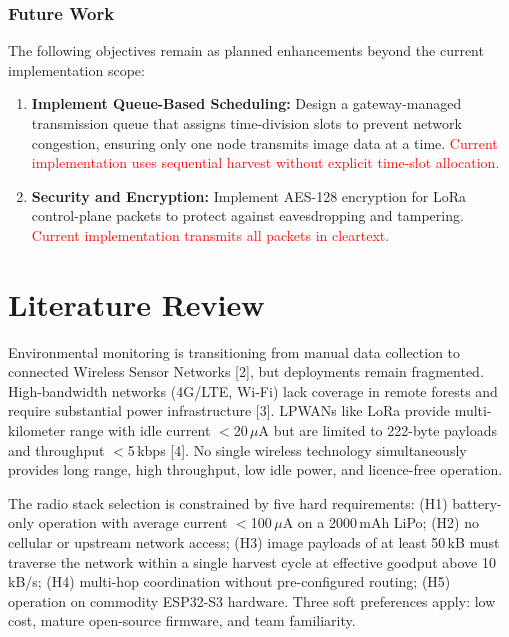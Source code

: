 \documentclass[12pt,a4paper]{article}
\DeclareRobustCommand{\changed}[1]{\textcolor{red}{#1}}
\begin{document}
\subsubsection{Future Work}

The following objectives remain as planned enhancements beyond the current implementation scope:

\begin{enumerate}
    \item \textbf{Implement Queue-Based Scheduling:} Design a gateway-managed transmission queue that assigns time-division slots to prevent network congestion, ensuring only one node transmits image data at a time. \changed{Current implementation uses sequential harvest without explicit time-slot allocation.}

    \item \textbf{Security and Encryption:} Implement AES-128 encryption for LoRa control-plane packets to protect against eavesdropping and tampering. \changed{Current implementation transmits all packets in cleartext.}
\end{enumerate}

\newpage


\section{Literature Review}
\label{sec:lit-review}

Environmental monitoring is transitioning from manual data collection to connected Wireless Sensor Networks [2], but deployments remain fragmented. High-bandwidth networks (4G/LTE, Wi-Fi) lack coverage in remote forests and require substantial power infrastructure [3]. LPWANs like LoRa provide multi-kilometer range with idle current $<$20\,$\mu$A but are limited to 222-byte payloads and throughput $<$5\,kbps [4]. No single wireless technology simultaneously provides long range, high throughput, low idle power, and licence-free operation.

The radio stack selection is constrained by five hard requirements: (H1) battery-only operation with average current $<$100\,$\mu$A on a 2000\,mAh LiPo; (H2) no cellular or upstream network access; (H3) image payloads of at least 50\,kB must traverse the network within a single harvest cycle at effective goodput above 10\,kB/s; (H4) multi-hop coordination without pre-configured routing; (H5) operation on commodity ESP32-S3 hardware. Three soft preferences apply: low cost, mature open-source firmware, and team familiarity.
\end{document}
